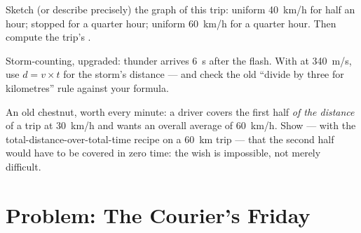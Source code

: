 \begin{exercise}[$\star\star$]\label{exo:g7:motion-average-speed:10}
Sketch (or describe precisely) the graph of this trip: uniform
\qty{40}{km/h} for half an hour; stopped for a quarter hour;
uniform \qty{60}{km/h} for a quarter hour. Then compute the
trip's .
\end{exercise}

\begin{exercise}[$\star\star$]\label{exo:g7:motion-average-speed:11}
Storm-counting, upgraded: thunder arrives \qty{6}{s} after the
flash. With  at \qty{340}{m/s}, use $d = v \times t$ for
the storm's distance --- and check the old ``divide by three
for kilometres'' rule against your formula.
\end{exercise}

\begin{exercise}[$\star\star\star$]\label{exo:g7:motion-average-speed:12}
An old chestnut, worth every minute: a driver covers the first
half \emph{of the distance} of a trip at \qty{30}{km/h} and
wants an overall average of \qty{60}{km/h}. Show --- with the
total-distance-over-total-time recipe on a \qty{60}{km} trip
--- that the second half would have to be covered in zero time:
the wish is impossible, not merely difficult.
\end{exercise}

\section{Problem: The Courier's Friday}


